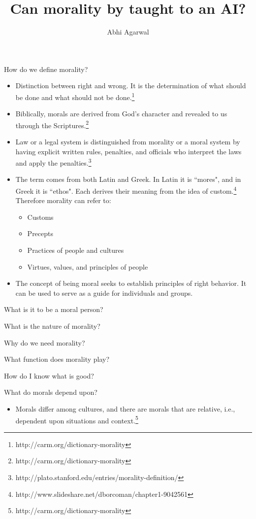 \documentclass[11pt, oneside]{article}   	%
\title{Can morality by taught to an AI?}
\author{Abhi Agarwal}
\date{}							%
\begin{document}
\maketitle

\par How do we define morality?
\begin{itemize}
	\item Distinction between right and wrong. It is the determination of what should be done and what should not be done.\footnote{http://carm.org/dictionary-morality}
	\item Biblically, morals are derived from God's character and revealed to us through the Scriptures.\footnote{http://carm.org/dictionary-morality}
	\item Law or a legal system is distinguished from morality or a moral system by having explicit written rules, penalties, and officials who interpret the laws and apply the penalties.\footnote{http://plato.stanford.edu/entries/morality-definition/}
	\item The term comes from both Latin and Greek. In Latin it is ``mores", and in Greek it is ``ethos". Each derives their meaning from the idea of custom.\footnote{http://www.slideshare.net/dborcoman/chapter1-9042561} Therefore morality can refer to:
	\begin{itemize}
		\item Customs
		\item Precepts
		\item Practices of people and cultures
		\item Virtues, values, and principles of people
	\end{itemize}
	\item The concept of being moral seeks to establish principles of right behavior. It can be used to serve as a guide for individuals and groups. 
\end{itemize}

\par What is it to be a moral person?

\par What is the nature of morality?

\par Why do we need morality?

\par What function does morality play?

\par How do I know what is good?

\par What do morals depend upon?
\begin{itemize}
	\item Morals differ among cultures, and there are morals that are relative, i.e., dependent upon situations and context.\footnote{http://carm.org/dictionary-morality}
\end{itemize}
\end{document}
